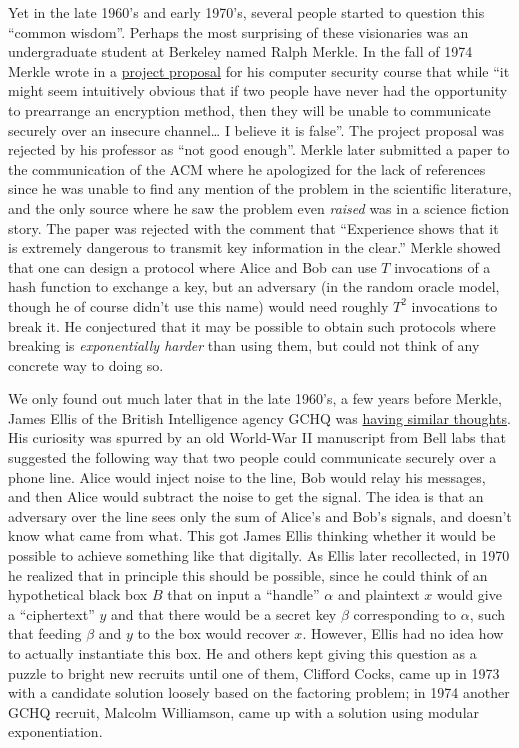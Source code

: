 Yet in the late 1960's and early 1970's, several people started to
question this ``common wisdom''. Perhaps the most surprising of these
visionaries was an undergraduate student at Berkeley named Ralph Merkle.
In the fall of 1974 Merkle wrote in a
\href{http://www.merkle.com/1974/}{project proposal} for his computer
security course that while ``it might seem intuitively obvious that if
two people have never had the opportunity to prearrange an encryption
method, then they will be unable to communicate securely over an
insecure channel\ldots{} I believe it is false''. The project proposal
was rejected by his professor as ``not good enough''. Merkle later
submitted a paper to the communication of the ACM where he apologized
for the lack of references since he was unable to find any mention of
the problem in the scientific literature, and the only source where he
saw the problem even \emph{raised} was in a science fiction story. The
paper was rejected with the comment that ``Experience shows that it is
extremely dangerous to transmit key information in the clear.'' Merkle
showed that one can design a protocol where Alice and Bob can use \(T\)
invocations of a hash function to exchange a key, but an adversary (in
the random oracle model, though he of course didn't use this name) would
need roughly \(T^2\) invocations to break it. He conjectured that it may
be possible to obtain such protocols where breaking is
\emph{exponentially harder} than using them, but could not think of any
concrete way to doing so.

We only found out much later that in the late 1960's, a few years before
Merkle, James Ellis of the British Intelligence agency GCHQ was
\href{http://cryptome.org/jya/ellisdoc.htm}{having similar thoughts}.
His curiosity was spurred by an old World-War II manuscript from Bell
labs that suggested the following way that two people could communicate
securely over a phone line. Alice would inject noise to the line, Bob
would relay his messages, and then Alice would subtract the noise to get
the signal. The idea is that an adversary over the line sees only the
sum of Alice's and Bob's signals, and doesn't know what came from what.
This got James Ellis thinking whether it would be possible to achieve
something like that digitally. As Ellis later recollected, in 1970 he
realized that in principle this should be possible, since he could think
of an hypothetical black box \(B\) that on input a ``handle'' \(\alpha\)
and plaintext \(x\) would give a ``ciphertext'' \(y\) and that there
would be a secret key \(\beta\) corresponding to \(\alpha\), such that
feeding \(\beta\) and \(y\) to the box would recover \(x\). However,
Ellis had no idea how to actually instantiate this box. He and others
kept giving this question as a puzzle to bright new recruits until one
of them, Clifford Cocks, came up in 1973 with a candidate solution
loosely based on the factoring problem; in 1974 another GCHQ recruit,
Malcolm Williamson, came up with a solution using modular
exponentiation.

